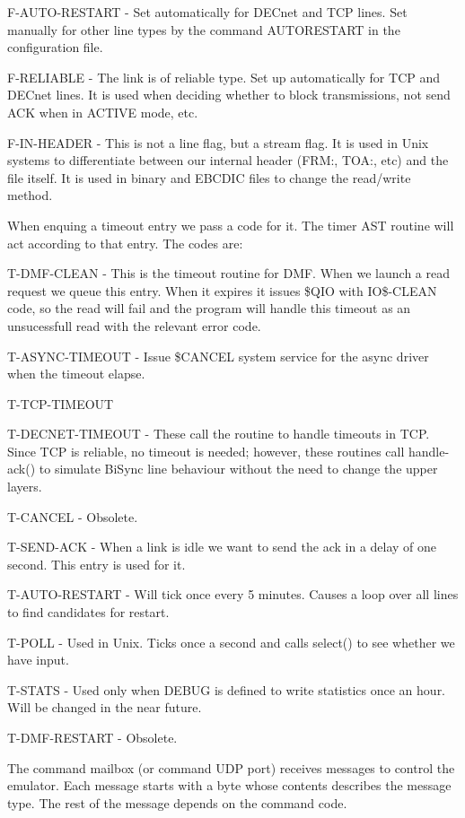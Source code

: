 F-AUTO-RESTART  -  Set  automatically  for  DECnet  and  TCP  lines. Set
manually for  other  line  types  by  the  command  AUTORESTART  in  the
configuration file.

F-RELIABLE  - The link is of reliable type. Set up automatically for TCP
and  DECnet  lines.  It  is  used  when  deciding   whether   to   block
transmissions, not send ACK when in ACTIVE mode, etc.

F-IN-HEADER  - This is not a line flag, but a stream flag. It is used in
Unix systems to differentiate between our internal header  (FRM:,  TOA:,
etc)  and  the  file  itself.  It  is used in binary and EBCDIC files to
change the read/write method.


When enquing a timeout entry we pass a code for  it.  The  timer  AST
routine will act according to that entry. The codes are:

T-DMF-CLEAN - This is the timeout routine for DMF. When we launch a read
request we queue this  entry.  When  it  expires  it  issues  \$QIO  with
IO\$-CLEAN  code,  so the read will fail and the program will handle this
timeout as an unsucessfull read with the relevant error code.

T-ASYNC-TIMEOUT - Issue \$CANCEL system service for the async driver when
the timeout elapse.

T-TCP-TIMEOUT

T-DECNET-TIMEOUT  -  These  call  the routine to handle timeouts in TCP.
Since TCP is reliable, no timeout is  needed;  however,  these  routines
call  handle-ack() to simulate BiSync line behaviour without the need to
change the upper layers.

T-CANCEL - Obsolete.

T-SEND-ACK - When a link is idle we want to send the ack in a  delay  of
one second. This entry is used for it.

T-AUTO-RESTART  - Will tick once every 5 minutes. Causes a loop over all
lines to find candidates for restart.

T-POLL - Used in Unix. Ticks once a second and  calls  select()  to  see
whether we have input.

T-STATS  -  Used  only when DEBUG is defined to write statistics once an
hour. Will be changed in the near future.

T-DMF-RESTART - Obsolete.


The command mailbox  (or  command  UDP  port)  receives  messages  to
control  the  emulator.  Each  message starts with a byte whose contents
describes the message type. The rest  of  the  message  depends  on  the
command code.

